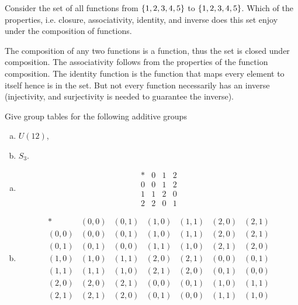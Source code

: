 \begin{problem}
	Consider the set of all functions from $ \{1,2,3,4,5\} $ to $ \{1,2,3,4,5\} $. Which of the properties, i.e. closure, associativity, identity, and inverse does this set enjoy under the composition of functions.
\end{problem}
\begin{solution}
	The composition of any two functions is a function, thus the set is closed under composition. The associativity follows from the properties of the function composition. The identity function is the function that maps every element to itself hence is in the set. But not every function necessarily has an inverse (injectivity, and surjectivity is needed to guarantee the inverse).
\end{solution}

\begin{problem}
	Give group tables for the following additive groups
	\begin{enumerate}[(a)]
		\item $ U(12) $,
		\item $ S_3 $.
	\end{enumerate}
\end{problem}

\begin{solution}
	\begin{enumerate}[(a)]
		\item
		\[
		\begin{array}{c|ccc}
			* & 0 & 1 & 2  \\
			\hline
			0 & 0 & 1 & 2 \\
			1 & 1 & 2 & 0 \\
			2 & 2 & 0 & 1 
		\end{array}
		\]
		\item 
		\[ \begin{array}{c|cccccc}
			*     & (0,0) & (0,1) & (1,0) & (1,1) & (2,0) & (2,1) \\
			\hline
			(0,0) & (0,0) & (0,1) & (1,0) & (1,1) & (2,0) & (2,1) \\
			(0,1) & (0,1) & (0,0) & (1,1) & (1,0) & (2,1) & (2,0) \\
			(1,0) & (1,0) & (1,1) & (2,0) & (2,1) & (0,0) & (0,1) \\
			(1,1) & (1,1) & (1,0) & (2,1) & (2,0) & (0,1) & (0,0) \\ 
			(2,0) & (2,0) & (2,1) & (0,0) & (0,1) & (1,0) & (1,1) \\
			(2,1) & (2,1) & (2,0) & (0,1) & (0,0) & (1,1) & (1,0)
		\end{array} \]
	\end{enumerate}
\end{solution}

